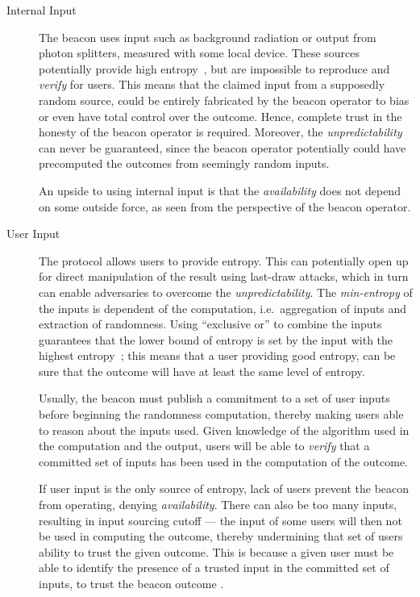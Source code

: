 \begin{description}

    \item[Internal Input]
        The beacon uses input such as background radiation or output from photon splitters, measured with some local device.
        These sources potentially provide high entropy~\cite{nistbeacon}, but are impossible to reproduce and \emph{verify} for users.
        This means that the claimed input from a supposedly random source, could be entirely fabricated by the beacon operator to bias or even have total control over the outcome.
        Hence, complete trust in the honesty of the beacon operator is required.
        Moreover, the \emph{unpredictability} can never be guaranteed, since the beacon operator potentially could have precomputed the outcomes from seemingly random inputs.

        An upside to using internal input is that the \emph{availability} does not depend on some outside force, as seen from the perspective of the beacon operator.
    \item[User Input]
        The protocol allows users to provide entropy.
        This can potentially open up for direct manipulation of the result using last-draw attacks, which in turn can enable adversaries to overcome the \emph{unpredictability}.
        The \emph{min-entropy} of the inputs is dependent of the computation, i.e.\ aggregation of inputs and extraction of randomness.
        Using \enquote{exclusive or} to combine the inputs guarantees that the lower bound of entropy is set by the input with the highest entropy~\cite{lenstra2015random};
        this means that a user providing good entropy, can be sure that the outcome will have at least the same level of entropy.

        Usually, the beacon must publish a commitment to a set of user inputs before beginning the randomness computation,  thereby making users able to reason about the inputs used.
        Given knowledge of the algorithm used in the computation and the output, users will be able to \emph{verify} that a committed set of inputs has been used in the computation of the outcome.

        If user input is the only source of entropy, lack of users prevent the beacon from operating, denying \emph{availability}.
        There can also be too many inputs, resulting in input sourcing cutoff ---
        the input of some users will then not be used in computing the outcome, thereby undermining that set of users ability to trust the given outcome.
        This is because a given user must be able to identify the presence of a trusted input in the committed set of inputs, to trust the beacon outcome .


\end{description}
